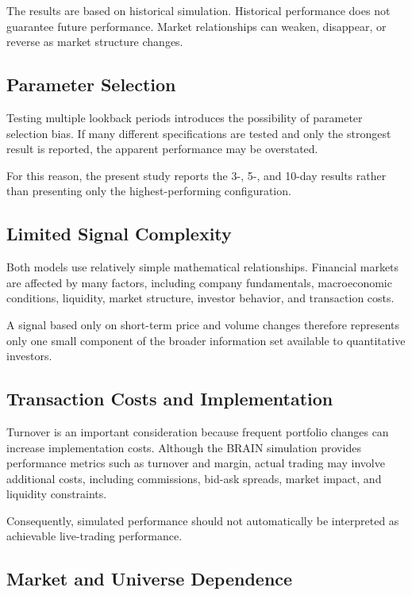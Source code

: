 \documentclass{article}
\begin{document}
The results are based on historical simulation. Historical performance does not guarantee future performance. Market relationships can weaken, disappear, or reverse as market structure changes.

\subsection{Parameter Selection}

Testing multiple lookback periods introduces the possibility of parameter selection bias. If many different specifications are tested and only the strongest result is reported, the apparent performance may be overstated.

For this reason, the present study reports the 3-, 5-, and 10-day results rather than presenting only the highest-performing configuration.

\subsection{Limited Signal Complexity}

Both models use relatively simple mathematical relationships. Financial markets are affected by many factors, including company fundamentals, macroeconomic conditions, liquidity, market structure, investor behavior, and transaction costs.

A signal based only on short-term price and volume changes therefore represents only one small component of the broader information set available to quantitative investors.

\subsection{Transaction Costs and Implementation}

Turnover is an important consideration because frequent portfolio changes can increase implementation costs. Although the BRAIN simulation provides performance metrics such as turnover and margin, actual trading may involve additional costs, including commissions, bid-ask spreads, market impact, and liquidity constraints.

Consequently, simulated performance should not automatically be interpreted as achievable live-trading performance.

\subsection{Market and Universe Dependence}
\end{document}
